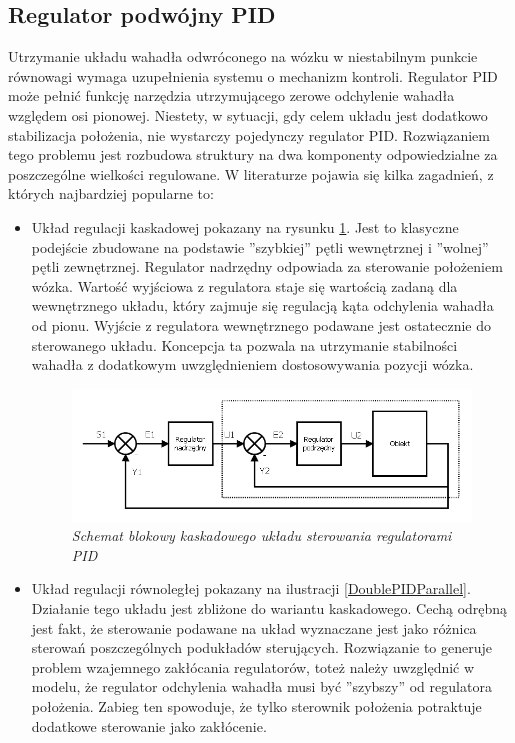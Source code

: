 \documentclass[12pt, oneside]{report}
\theoremstyle{definition}
\begin{document}
\subsection{Regulator podwójny PID}
\label{DoublePID}
Utrzymanie układu wahadła odwróconego na wózku w niestabilnym punkcie równowagi wymaga uzupełnienia systemu o mechanizm kontroli. Regulator PID może pełnić funkcję narzędzia utrzymującego zerowe odchylenie wahadła względem osi pionowej. Niestety, w sytuacji, gdy celem układu jest dodatkowo stabilizacja położenia, nie wystarczy pojedynczy regulator PID. Rozwiązaniem tego problemu jest rozbudowa struktury na dwa komponenty odpowiedzialne za poszczególne wielkości regulowane. W literaturze pojawia się kilka zagadnień, z których najbardziej popularne to:
\begin{itemize}
\item Układ regulacji kaskadowej pokazany na rysunku \ref{DoublePIDCascade}. Jest to klasyczne podejście zbudowane na podstawie ''szybkiej'' pętli wewnętrznej i ''wolnej'' pętli zewnętrznej. Regulator nadrzędny odpowiada za sterowanie położeniem wózka. Wartość wyjściowa z regulatora staje się wartością zadaną dla wewnętrznego układu, który zajmuje się regulacją kąta odchylenia wahadła od pionu. Wyjście z regulatora wewnętrznego podawane jest ostatecznie do sterowanego układu. Koncepcja ta pozwala na utrzymanie stabilności wahadła z dodatkowym uwzględnieniem dostosowywania pozycji wózka.

\begin{figure}[H]
	\centering
		\includegraphics[width = 350pt]{DoublePIDCascade} 
		\caption{\textit{Schemat blokowy kaskadowego układu sterowania regulatorami PID\cite{JTJT}}}
		\label{DoublePIDCascade}
\end{figure}

\item Układ regulacji równoległej pokazany na ilustracji \ref{DoublePIDParallel}. Działanie tego układu jest zbliżone do wariantu kaskadowego. Cechą odrębną jest fakt, że sterowanie podawane na układ wyznaczane jest jako różnica sterowań poszczególnych podukładów sterujących. Rozwiązanie to generuje problem wzajemnego zakłócania regulatorów, toteż należy uwzględnić w modelu, że regulator odchylenia wahadła musi być ''szybszy'' od regulatora położenia. Zabieg ten spowoduje, że tylko sterownik położenia potraktuje dodatkowe sterowanie jako zakłócenie.


\end{itemize}
\end{document}
